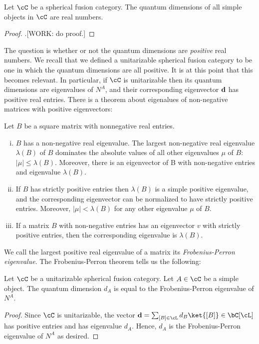 \begin{cor} Let $\cC$ be a spherical fusion category. The quantum dimensions of all simple objects in $\cC$ are real numbers.
\end{cor}
\begin{proof}.[WORK: do proof.]
\end{proof}

The question is whether or not the quantum dimensions are \textit{positive} real numbers. We recall that we defined a unitarizable spherical fusion category to be one in which the quantum dimensions are all positive. It is at this point that this becomes relevant. In particular, if $\cC$ is unitarizable then its quantum dimensions are eigenvalues of $N^A$, and their corresponding eigenvector $\bold{d}$ has positive real entries. There is a theorem about eigenalues of non-negative matrices with positive eigenvectors:

\begin{thrm} Let $B$ be a square matrix with nonnegative real entries.

\begin{enumerate}[(i)]
\item $B$ has a non-negative real eigenvalue. The largest non-negative real eigenvalue $\lambda(B)$ of $B$ dominates the absolute values of all other eigenvalues $\mu$ of $B$: $|\mu|\leq \lambda(B)$. Moreover, there is an eigenvector of B with non-negative entries
and eigenvalue $\lambda(B)$.
\item If $B$ has strictly positive entries then $\lambda(B)$ is a simple positive eigenvalue, and the corresponding eigenvector can be normalized to have strictly positive entries. Moreover, $|\mu| < \lambda(B)$ for any other eigenvalue $\mu$ of $B$.
\item If a matrix $B$ with non-negative entries has an eigenvector $v$ with strictly
positive entries, then the corresponding eigenvalue is $\lambda(B)$.
\end{enumerate}
\end{thrm}

We call the largest positive real eigenvalue of a matrix its \textit{Frobenius-Perron eigenvalue}. The Frobenius-Perron theorem tells us the following:

\begin{cor} Let $\cC$ be a unitarizable spherical fusion category. Let $A\in \cC$ be a simple object. The quantum dimension $d_A$ is equal to the Frobenius-Perron eigenvalue of $N^A$.
\end{cor}
\begin{proof} Since $\cC$  is unitarizable, the vector $\bold{d} = \sum_{[B]\in \cL} d_{B}\ket{[B]}\in \bC[\cL]$ has positive entries and has eigenvalue $d_A$. Hence, $d_A$ is the Frobenius-Perron eigenvalue of $N^A$ as desired.
\end{proof}

